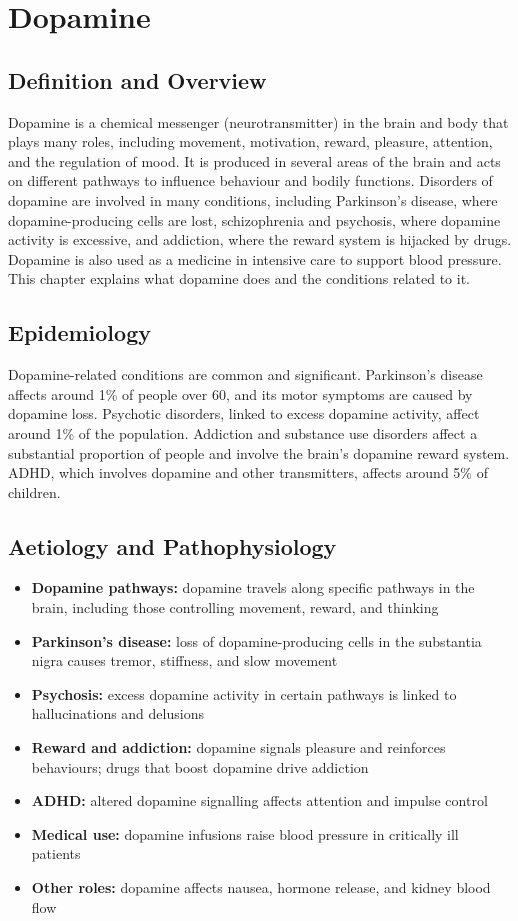 \chapter{Dopamine}

\section*{Definition and Overview}
Dopamine is a chemical messenger (neurotransmitter) in the brain and body that plays many roles, including movement, motivation, reward, pleasure, attention, and the regulation of mood. It is produced in several areas of the brain and acts on different pathways to influence behaviour and bodily functions. Disorders of dopamine are involved in many conditions, including Parkinson's disease, where dopamine-producing cells are lost, schizophrenia and psychosis, where dopamine activity is excessive, and addiction, where the reward system is hijacked by drugs. Dopamine is also used as a medicine in intensive care to support blood pressure. This chapter explains what dopamine does and the conditions related to it.

\section*{Epidemiology}
Dopamine-related conditions are common and significant. Parkinson's disease affects around 1\% of people over 60, and its motor symptoms are caused by dopamine loss. Psychotic disorders, linked to excess dopamine activity, affect around 1\% of the population. Addiction and substance use disorders affect a substantial proportion of people and involve the brain's dopamine reward system. ADHD, which involves dopamine and other transmitters, affects around 5\% of children.

\section*{Aetiology and Pathophysiology}
\begin{itemize}
    \item \textbf{Dopamine pathways:} dopamine travels along specific pathways in the brain, including those controlling movement, reward, and thinking
    \item \textbf{Parkinson's disease:} loss of dopamine-producing cells in the substantia nigra causes tremor, stiffness, and slow movement
    \item \textbf{Psychosis:} excess dopamine activity in certain pathways is linked to hallucinations and delusions
    \item \textbf{Reward and addiction:} dopamine signals pleasure and reinforces behaviours; drugs that boost dopamine drive addiction
    \item \textbf{ADHD:} altered dopamine signalling affects attention and impulse control
    \item \textbf{Medical use:} dopamine infusions raise blood pressure in critically ill patients
    \item \textbf{Other roles:} dopamine affects nausea, hormone release, and kidney blood flow
\end{itemize}

